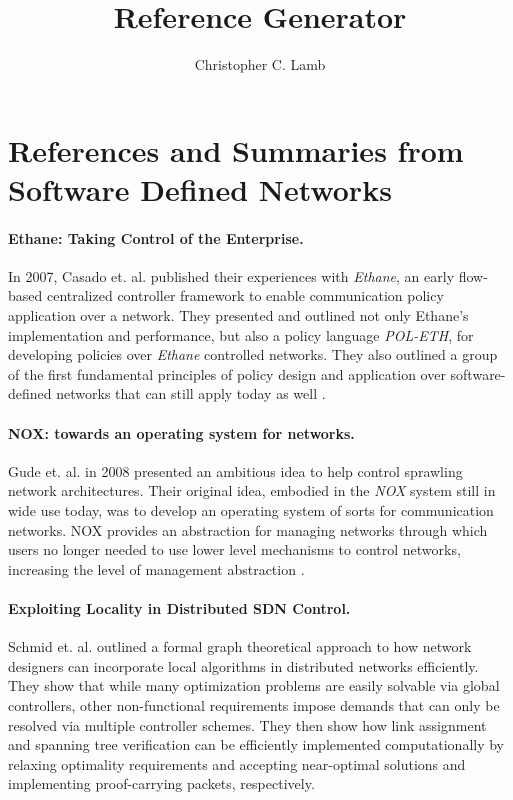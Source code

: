 \documentclass[10pt,letterpaper]{article}
\author{Christopher C. Lamb}
\title{Reference Generator}
\begin{document}
\section{References and Summaries from Software Defined Networks}

\paragraph{Ethane: Taking Control of the Enterprise.} In 2007, Casado et. al. published their experiences with {\sl Ethane}, an early flow-based centralized controller framework to enable communication policy application over a network.  They presented and outlined not only Ethane's implementation and performance, but also a policy language {\sl POL-ETH}, for developing policies over {\sl Ethane} controlled networks.  They also outlined a group of the first fundamental principles of policy design and application over software-defined networks that can still apply today as well \cite{CaFrPeLu:07}.

\paragraph{NOX: towards an operating system for networks.}  Gude et. al. in 2008 presented an ambitious idea to help control sprawling network architectures.  Their original idea, embodied in the {\sl NOX} system still in wide use today, was to develop an operating system of sorts for communication networks.  NOX provides an abstraction for managing networks through which users no longer needed to use lower level mechanisms to control networks, increasing the level of management abstraction \cite{GuKoPePf:08}.

\paragraph{Exploiting Locality in Distributed SDN Control.} Schmid et. al. outlined a formal graph theoretical approach to how network designers can incorporate local algorithms in distributed networks efficiently.  They show that while many optimization problems are easily solvable via global controllers, other non-functional requirements impose demands that can only be resolved via multiple controller schemes. They then show how link assignment and spanning tree verification can be efficiently implemented computationally by relaxing optimality requirements and accepting near-optimal solutions and implementing proof-carrying packets, respectively\cite{ScSu:13}.  
\end{document}
